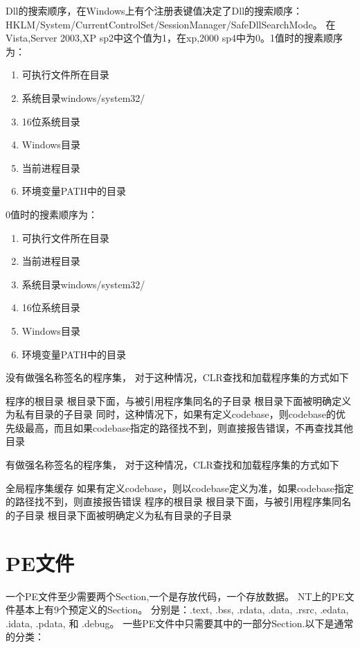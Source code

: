 \documentclass{book}
\begin{document}
Dll的搜索顺序，在Windows上有个注册表键值决定了Dll的搜索顺序：
HKLM/System/CurrentControlSet/SessionManager/SafeDllSearchMode。
在Vista,Server 2003,XP sp2中这个值为1，在xp,2000 sp4中为0。1值时的搜素顺序为：

\begin{enumerate}
\setcounter{enumi}{0}
\item{可执行文件所在目录}
\item{系统目录windows/system32/}
\item{16位系统目录}
\item{Windows目录}
\item{当前进程目录}
\item{环境变量PATH中的目录}
\end{enumerate}

0值时的搜素顺序为：

\begin{enumerate}
\setcounter{enumi}{0}
\item{可执行文件所在目录}
\item{当前进程目录}
\item{系统目录windows/system32/}
\item{16位系统目录}
\item{Windows目录}
\item{环境变量PATH中的目录}
\end{enumerate}


没有做强名称签名的程序集，
对于这种情况，CLR查找和加载程序集的方式如下

程序的根目录
根目录下面，与被引用程序集同名的子目录
根目录下面被明确定义为私有目录的子目录
同时，这种情况下，如果有定义codebase，则codebase的优先级最高，而且如果codebase指定的路径找不到，则直接报告错误，不再查找其他目录

有做强名称签名的程序集，
对于这种情况，CLR查找和加载程序集的方式如下

全局程序集缓存
如果有定义codebase，则以codebase定义为准，如果codebase指定的路径找不到，则直接报告错误
程序的根目录
根目录下面，与被引用程序集同名的子目录
根目录下面被明确定义为私有目录的子目录

\section{PE文件}

一个PE文件至少需要两个Section,一个是存放代码，一个存放数据。
NT上的PE文件基本上有9个预定义的Section。
分别是：.text, .bss, .rdata, .data, .rsrc, .edata, .idata, .pdata, 和 .debug。
一些PE文件中只需要其中的一部分Section.以下是通常的分类：
\end{document}
